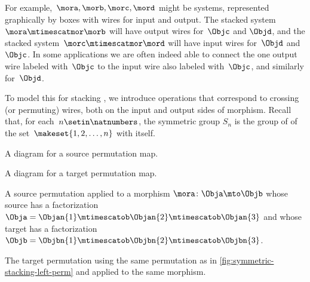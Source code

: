 For example,~$\mora, \morb, \morc, \mord$ might be systems, represented graphically by boxes with wires for input and output.
The stacked system~$\mora \mtimescatmor \morb$ will have output wires for~$\Objc$ and $\Objd$, and the stacked system~$\morc \mtimescatmor \mord$ will have input wires for~$\Objd$ and~$\Objc$.
In some applications we are often indeed able to connect the one output wire labeled with~$\Objc$ to the input wire also labeled with~$\Objc$, and similarly for~$\Objd$.

To model this for stacking , we introduce operations that correspond to crossing (or permuting) wires, both on the input and output sides of morphism.
Recall that, for each~$n \setin \natnumbers$, the symmetric group $S_n$ is the group of  of the set~$\makeset{1, 2, \ldots, n }$ with itself.


\begin{marginfigure}
    \centering
    \caption{A diagram for a source permutation map.}
    \label{fig:symmetric-stacking-left-perm}
\end{marginfigure}

\begin{marginfigure}
    \centering
    \caption{A diagram for a target permutation map.}
\end{marginfigure}

\begin{marginfigure}
    \centering
    \caption{A source permutation applied to a morphism $\mora \colon \Obja \mto \Objb$ whose source has a factorization $\Obja = \Objan{1} \mtimescatob \Objan{2}  \mtimescatob \Objan{3}$ and whose target has a factorization $\Objb = \Objbn{1} \mtimescatob \Objbn{2}  \mtimescatob \Objbn{3}$.}
    \label{fig:symmetric-stacking-left-perm-evaluated}
\end{marginfigure}

\begin{marginfigure}
    \centering
    \caption{The target permutation using the same permutation as in \cref{fig:symmetric-stacking-left-perm} and applied to the same morphism.}
    \label{fig:symmetric-stacking-target-perm}
\end{marginfigure}

